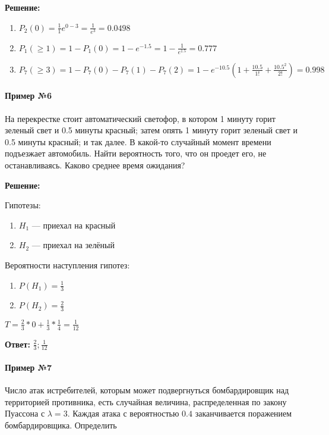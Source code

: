 \documentclass{article}
\begin{document}
\textbf{Решение:}

\begin{enumerate}
    \item $P_2(0) = \frac{1}{1} e^{0-3} = \frac{1}{e^3} = 0.0498$
    \item $P_1(\ge 1) = 1 - P_1(0) = 1 - e^{-1.5} = 1 - \frac{1}{e^{1.5}} = 0.777$
    \item $P_7(\ge 3) = 1 - P_7(0) - P_7(1) - P_7(2) = 1 - e^{-10.5} (1 + \frac{10.5}{1!} + \frac{10.5^2}{2!}) = 0.998$
\end{enumerate}

\paragraph{Пример №6}

На перекрестке стоит автоматический светофор, в котором 1 минуту горит зеленый свет и 0.5 минуты красный; затем опять 1 минуту горит зеленый свет и 0.5 минуты красный; и так далее. В какой-то случайный момент времени подъезжает автомобиль. Найти вероятность того, что он проедет его, не останавливаясь. Каково среднее время ожидания?

\textbf{Решение:}

Гипотезы:

\begin{enumerate}
    \item $H_1$ — приехал на красный
    \item $H_2$ — приехал на зелёный
\end{enumerate}

Вероятности наступления гипотез:

\begin{enumerate}
    \item $P(H_1) = \frac{1}{3}$
    \item $P(H_2) = \frac{2}{3}$
\end{enumerate}

$T = \frac{2}{3} * 0 + \frac{1}{3} * \frac{1}{4} = \frac{1}{12}$

\textbf{Ответ:} $\frac{2}{3}; \frac{1}{12}$

\paragraph{Пример №7}

Число атак истребителей, которым может подвергнуться бомбардировщик над территорией противника, есть случайная величина, распределенная по закону Пуассона с $\lambda = 3$. Каждая атака с вероятностью $0.4$ заканчивается поражением бомбардировщика. Определить
\end{document}
